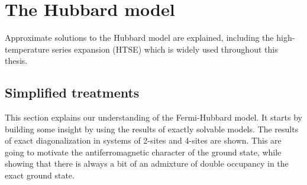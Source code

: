 \documentclass[oneside,11pt]{memoir}
\begin{document}
 
\chapter{The Hubbard model}

Approximate solutions to the Hubbard model are explained,  including the
high-temperature series expansion (HTSE) which is widely used throughout this
thesis.   


%

\section{Simplified treatments}

This section explains our understanding of the Fermi-Hubbard model.  It starts
by building some insight by using the results of exactly solvable models.   The
results of exact diagonalization in systems of 2-sites and 4-sites are shown.
This are going to motivate the antiferromagnetic character of the ground state,
while showing that there is always a bit of an admixture of double occupancy in
the exact ground state.  
\end{document}
